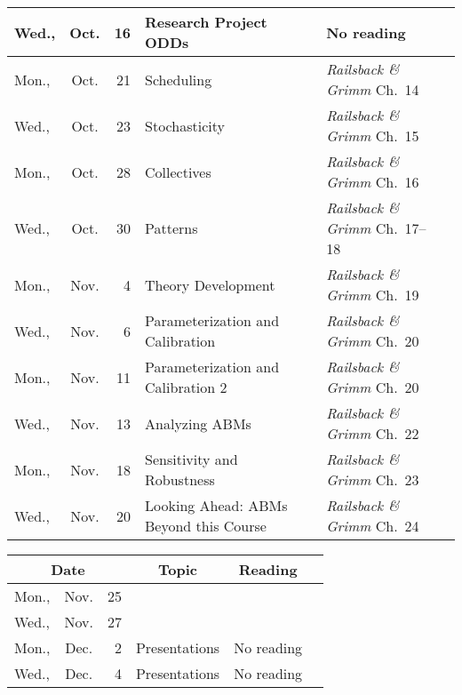 \documentclass[11pt,twoside]{jgsyllabus}\usepackage[]{graphicx}\usepackage[]{xcolor}
\begin{document}
\begin{center}
\begin{tabular}{l@{~}c@{~}r>{\raggedright}m{2.6in}>{\centering}m{2in}c}
   \midrule
Wed., & Oct. &  16 & Research Project ODDs & No reading &  \\ 
   \midrule
Mon., & Oct. &  21 & Scheduling & \emph{Railsback \& Grimm\/} Ch.~14 &  \\ 
   \midrule
Wed., & Oct. &  23 & Stochasticity & \emph{Railsback \& Grimm\/} Ch.~15 &  \\ 
   \midrule
Mon., & Oct. &  28 & Collectives & \emph{Railsback \& Grimm\/} Ch.~16 &  \\ 
   \midrule
Wed., & Oct. &  30 & Patterns & \emph{Railsback \& Grimm\/} Ch.~17--18 &  \\ 
   \midrule
Mon., & Nov. &   4 & Theory Development & \emph{Railsback \& Grimm\/} Ch.~19 &  \\ 
   \midrule
Wed., & Nov. &   6 & Parameterization and Calibration & \emph{Railsback \& Grimm\/} Ch.~20 &  \\ 
   \midrule
Mon., & Nov. &  11 & Parameterization and Calibration 2 & \emph{Railsback \& Grimm\/} Ch.~20 &  \\ 
   \midrule
Wed., & Nov. &  13 & Analyzing ABMs & \emph{Railsback \& Grimm\/} Ch.~22 &  \\ 
   \midrule
Mon., & Nov. &  18 & Sensitivity and Robustness & \emph{Railsback \& Grimm\/} Ch.~23 &  \\ 
   \midrule
Wed., & Nov. &  20 & Looking Ahead: ABMs Beyond this Course & \emph{Railsback \& Grimm\/} Ch.~24 &  \\ 
   \bottomrule
\end{tabular}

\end{center}

\begin{center}
\begin{tabular}{l@{~}c@{~}r>{\raggedright}m{2.6in}>{\centering}m{2in}c}
  \toprule
  \multicolumn{3}{c}{\bfseries Date} & \multicolumn{1}{c}{\bfseries Topic} &\multicolumn{1}{c}{\bfseries Reading} &\\
 \midrule
Mon., & Nov. &  25 & \multicolumn{2}{l}{\multirow{3}{*}{\bfseries\scshape\Large Thanksgiving Break}} & \\%
  Wed., & Nov. &  27 &  &  &  \\ 
   \midrule
Mon., & Dec. &   2 & Presentations & No reading &  \\ 
   \midrule
Wed., & Dec. &   4 & Presentations & No reading &  \\ 
   \bottomrule
\end{tabular}

\end{center}
%
\end{document}
